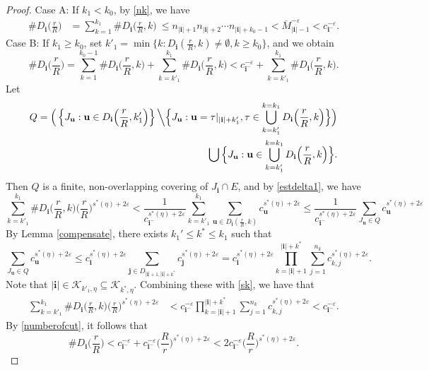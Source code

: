 \documentclass[10pt,a4paper]{amsart}
\newcommand{\bu}{\mathbf{u}}
\newcommand{\eps}{\varepsilon}
\newcommand{\f}{\frac}
\newcommand{\iii}{\mathbf{i}}
\newcommand{\jjj}{\mathbf{j}}
\newcommand{\kk}{\mathcal{K}}
\newcommand{\om}{\overline{M}}
\renewcommand{\ge}{\geqslant}
\renewcommand{\leq}{\leqslant}
\renewcommand{\le}{\leqslant}
\begin{document}
\begin{proof}
		\noindent	Case A: If $k_1 <k_0$,  by \eqref{nk}, we have
		\begin{align*}
			\# D_{\iii}\Big(\f rR\Big)
			&=\sum_{k=1}^{k_1}\# D_{\iii}\Big(\f rR,k\Big)\ \le n_{|\iii|+1}n_{|\iii|+2}\cdots n_{|\iii|+k_0-1} <\om_{|\iii|-1}^{-{\eps}} <c_{\iii^-}^{-{\eps}}.
		\end{align*}
		Case B: If $k_1 \ge k_0$, set $	k'_1=\min\big\{k: D_\iii(\f rR,k)\neq\emptyset,k\ge k_0\big\}$, and  we obtain
		\begin{equation}\label{numberofcut}
			\# D_{\iii}\Big(\f rR\Big)
			=\sum_{k=1}^{k_0-1}\# D_{\iii}\Big(\f rR,k\Big)+\sum_{k=k'_1}^{k_1}\# D_{\iii}\Big(\f rR,k\Big)<c_{\iii^-}^{-{\eps}}+\sum_{k=k'_1}^{k_1}\#D_{\iii}\Big(\f rR,k\Big).
		\end{equation}
	Let
		\begin{align*}
			Q=\Big(\left\{J_\bu:\bu\in D_\iii\Big(\f rR,k'_1\Big)\right\}\Big\backslash \Big\{J_{\bu}:\bu=\mathbf{\tau}|_{|\iii|+k'_1},\mathbf{\tau}\in\bigcup_{k=k'_1}^{k=k_1}D_{\iii}\Big(\f rR,k\Big)\Big\}\Big)\\
			\bigcup \Big\{J_{\bu}:\bu\in \bigcup_{k=k'_1}^{k=k_1}D_{\iii}\Big(\f rR,k\Big)\Big\}.
		\end{align*}
	Then $Q$ is a finite, non-overlapping covering of $J_\iii \cap E$, and by \eqref{estdelta1}, we have 
		$$	
		\sum_{k=k'_1}^{k_1}\# D_{\iii}\Big(\f rR,k\Big)\Big(\f rR\Big)^{s^*(\eta)+2\eps} <\frac1 {c_{\iii^-}^{s^*(\eta)+2\eps}}\sum_{k=k'_1}^{k_1}\sum_{\bu\in D_{\iii}(\f rR,k)}c_{\bu}^{s^*(\eta)+2\eps} 
		\le\frac1 {c_{\iii^-}^{s^*(\eta)+2\eps}}\sum_{J_\bu\in Q}c_{\bu}^{s^*(\eta)+2\eps}
		$$	
		By Lemma \ref{compensate},  there exists  $k_1'\leq k^*\leq k_1$ such that  
		$$
		\sum_{J_\bu\in Q}c_{\bu}^{s^*(\eta)+2\eps}\leq c_{\iii}^{s^*(\eta)+2\eps}\sum_{\jjj\in  D_{|\iii|+1,|\iii|+k^*}}c_{\jjj}^{s^*(\eta)+2\eps}= c_{\iii}^{s^*(\eta)+2\eps} \prod_{k=|\iii|+1}^{|\iii|+k^*}\sum_{j=1}^{n_k}c_{k,j}^{s^*(\eta)+2\eps}.
		$$
		Note that $|\iii|\in \kk_{k'_1,\eta}\subseteq \kk_{k^*,\eta}$.   Combining these with	\eqref{sk}, we have that
		\begin{equation*} %
			\begin{aligned}
				\sum_{k=k'_1}^{k_1}\# D_{\iii}\Big(\f rR,k\Big)\Big(\f rR\Big)^{s^*(\eta)+2\eps}
				&<c_{\iii^-}^{-\eps}\prod_{k=|\iii|+1}^{|\iii|+k^*}\sum_{j=1}^{n_k}c_{k,j}^{s^*(\eta)+2\eps}<c_{\iii^-}^{-\eps}.
			\end{aligned}
		\end{equation*}  
		By  \eqref{numberofcut}, it follows that
		\begin{equation*}
			\#D_{\iii}\Big(\f rR\Big)< c_{\iii^-}^{-{\eps}}+c_{\iii^-}^{-{\eps}}\Big(\f Rr \Big)^{s^*(\eta)+2\eps}< 2c_{\iii^-}^{-{\eps}}\Big(\f Rr\Big)^{s^*(\eta)+2\eps}.
		\end{equation*}
		

\end{proof}
\end{document}
